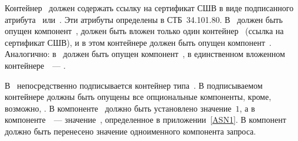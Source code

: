 Контейнер~ должен содержать ссылку на сертификат СШВ в виде
подписанного атрибута~ или~.
Эти атрибуты определены в СТБ~34.101.80.
%
В~ должен быть опущен компонент~, должен
быть вложен только один контейнер~ (ссылка на сертификат СШВ), и
в этом контейнере должен быть опущен компонент~.
%
Аналогично: в~ должен быть опущен
компонент~, в единственном вложенном
контейнере~~--- .

В~ непосредственно подписывается контейнер типа~.
%
В подписываемом контейнере должны быть опущены все опциональные компоненты,
кроме, возможно, .
%
В компоненте~ должно быть установлено значение~$1$, а в
компоненте~~--- значение~, определенное в
приложении~\ref{ASN1}.
%
В компонент~ должно быть перенесено значение одноименного
компонента запроса.
